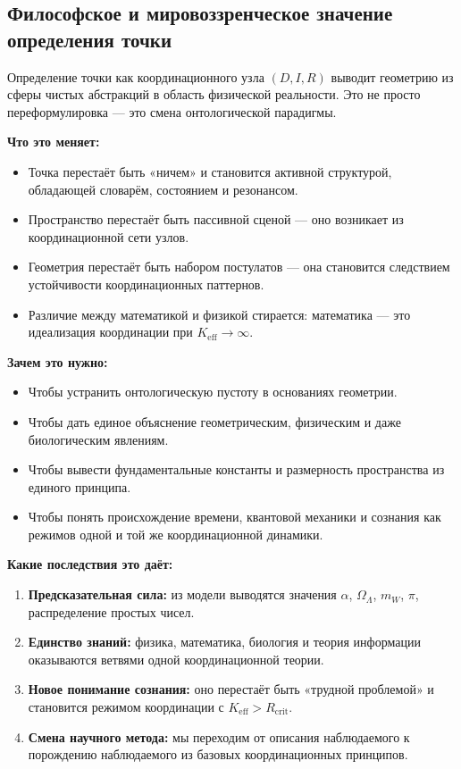 \documentclass[12pt,a4paper]{article}
\newcommand{\Keff}{K_{\mathrm{eff}}}
\newcommand{\Rcrit}{R_{\mathrm{crit}}}
\begin{document}
	\subsection*{Философское и мировоззренческое значение определения точки}
	
	Определение точки как координационного узла \( (D, I, R) \) выводит геометрию из сферы чистых абстракций в область физической реальности. Это не просто переформулировка — это смена онтологической парадигмы.
	
	\medskip
	\textbf{Что это меняет:}
	\begin{itemize}
		\item Точка перестаёт быть «ничем» и становится активной структурой, обладающей словарём, состоянием и резонансом.
		\item Пространство перестаёт быть пассивной сценой — оно возникает из координационной сети узлов.
		\item Геометрия перестаёт быть набором постулатов — она становится следствием устойчивости координационных паттернов.
		\item Различие между математикой и физикой стирается: математика — это идеализация координации при \(\Keff \to \infty\).
	\end{itemize}
	
	\medskip
	\textbf{Зачем это нужно:}
	\begin{itemize}
		\item Чтобы устранить онтологическую пустоту в основаниях геометрии.
		\item Чтобы дать единое объяснение геометрическим, физическим и даже биологическим явлениям.
		\item Чтобы вывести фундаментальные константы и размерность пространства из единого принципа.
		\item Чтобы понять происхождение времени, квантовой механики и сознания как режимов одной и той же координационной динамики.
	\end{itemize}
	
	\medskip
	\textbf{Какие последствия это даёт:}
	\begin{enumerate}
		\item \textbf{Предсказательная сила:} из модели выводятся значения \(\alpha\), \(\Omega_\Lambda\), \(m_W\), \(\pi\), распределение простых чисел.
		\item \textbf{Единство знаний:} физика, математика, биология и теория информации оказываются ветвями одной координационной теории.
		\item \textbf{Новое понимание сознания:} оно перестаёт быть «трудной проблемой» и становится режимом координации с \(\Keff > \Rcrit\).
		\item \textbf{Смена научного метода:} мы переходим от описания наблюдаемого к порождению наблюдаемого из базовых координационных принципов.
	\end{enumerate}
	
\end{document}

